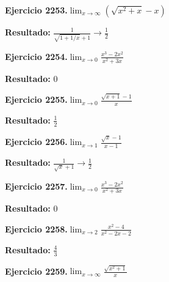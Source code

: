 \documentclass[10pt,a4paper]{article}
\begin{document}
\begin{ejbox}
\textbf{Ejercicio 2253.}\quad $\lim_{x\to \infty} (\sqrt{x^2+x} - x)$
\end{ejbox}

\begin{solbox}
\textbf{Resultado:} \(\displaystyle \frac{1}{\sqrt{1+1/x}+1} \to \frac{1}{2}\)
\end{solbox}

\begin{ejbox}
\textbf{Ejercicio 2254.}\quad $\lim_{x\to 0} \frac{x^3-2x^2}{x^2+3x}$
\end{ejbox}

\begin{solbox}
\textbf{Resultado:} \(\displaystyle 0\)
\end{solbox}

\newpage
\begin{ejbox}
\textbf{Ejercicio 2255.}\quad $\lim_{x\to 0} \frac{\sqrt{x+1}-1}{x}$
\end{ejbox}

\begin{solbox}
\textbf{Resultado:} \(\displaystyle \frac{1}{2}\)
\end{solbox}

\begin{ejbox}
\textbf{Ejercicio 2256.}\quad $\lim_{x\to 1} \frac{\sqrt{x}-1}{x-1}$
\end{ejbox}

\begin{solbox}
\textbf{Resultado:} \(\displaystyle \frac{1}{\sqrt{x}+1} \to \frac{1}{2}\)
\end{solbox}

\begin{ejbox}
\textbf{Ejercicio 2257.}\quad $\lim_{x\to 0} \frac{x^3-2x^2}{x^2+3x}$
\end{ejbox}

\begin{solbox}
\textbf{Resultado:} \(\displaystyle 0\)
\end{solbox}

\newpage
\begin{ejbox}
\textbf{Ejercicio 2258.}\quad $\lim_{x\to 2} \frac{x^2-4}{x^2-2x-2}$
\end{ejbox}

\begin{solbox}
\textbf{Resultado:} \(\displaystyle \frac{4}{3}\)
\end{solbox}

\begin{ejbox}
\textbf{Ejercicio 2259.}\quad $\lim_{x\to \infty} \frac{\sqrt{x^2+1}}{x}$
\end{ejbox}
\end{document}
